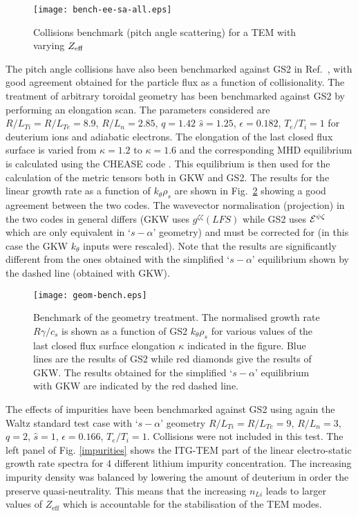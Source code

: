 \begin{figure}[htb] 
\begin{center}
\texttt{[image: bench-ee-sa-all.eps]}
\caption{Collisions benchmark (pitch angle scattering) for a TEM with varying
$Z_{\rm eff}$} 
\label{colls-tem}
\end{center}
\end{figure}

The pitch angle collisions have also been benchmarked against GS2 in Ref.~\cite{PEE09scmode}, with good agreement 
obtained for the particle flux as a function of collisionality. 
The treatment of arbitrary toroidal geometry has been benchmarked against GS2 by performing an elongation scan. The parameters considered are $R/L_{Ti} = R/ L_{Te} = 8.9$, $R/ L_n = 2.85$, $q = 1.42$ $\hat s = 1.25$, $\epsilon = 0.182$, $T_e/T_i =1$ for deuterium ions and adiabatic electrons. 
The elongation of the last closed flux surface is varied from $\kappa=1.2$ to $\kappa=1.6$ and the corresponding MHD equilibrium is calculated using the CHEASE code \cite{LUT96}.
This equilibrium is then used for the calculation of the metric tensors both in GKW and GS2. 
The results for the linear growth rate as a function of $k_\theta\rho_s$ are shown in Fig.~\ref{geom-bench} showing a good agreement between the two codes.  The wavevector
normalisation (projection) in the two codes in general differs (GKW uses
$g^{\zeta\zeta}(LFS)$ while GS2 uses ${\cal E}^{\psi\zeta}$ \cite{dorland-note} which are only equivalent in `$s-\alpha$' geometry) and must
be corrected for (in this case the GKW $k_\theta$ inputs were rescaled). 
Note that the results are significantly different from the ones obtained with the simplified `$s-\alpha$' equilibrium shown by 
the dashed line (obtained with GKW).
\begin{figure}[htb] 
\begin{center}
\texttt{[image: geom-bench.eps]}
\caption{Benchmark of the geometry treatment. The normalised growth 
rate $R \gamma / c_s$ is shown as a function of GS2 $k_\theta\rho_s$ for various values of the last closed flux surface elongation $\kappa$ indicated in 
the figure. Blue lines are the results of GS2 while red diamonds give the results of GKW. The results
obtained for the simplified `$s-\alpha$' equilibrium
with GKW are indicated by the red dashed line.} 
\label{geom-bench}
\end{center}
\end{figure}  

The effects of impurities have been benchmarked against GS2 using again the Waltz standard test case with
`$s-\alpha$' geometry $R/L_{Ti} = R/ L_{Te} = 9$, $R/ L_n = 3$, $q = 2$, $\hat s = 1$, $\epsilon = 0.166$, $T_e/T_i = 1$. Collisions were not included in this test. The left panel of Fig. \ref{impurities} shows the ITG-TEM part of the linear electro-static growth rate spectra for 4 different lithium impurity concentration. The increasing impurity density was balanced by lowering the amount of deuterium in order the preserve quasi-neutrality. This means that the increasing $n_{Li}$ leads to larger values of $Z_{\mathrm{eff}}$ which is accountable for the stabilisation of the TEM modes. 

